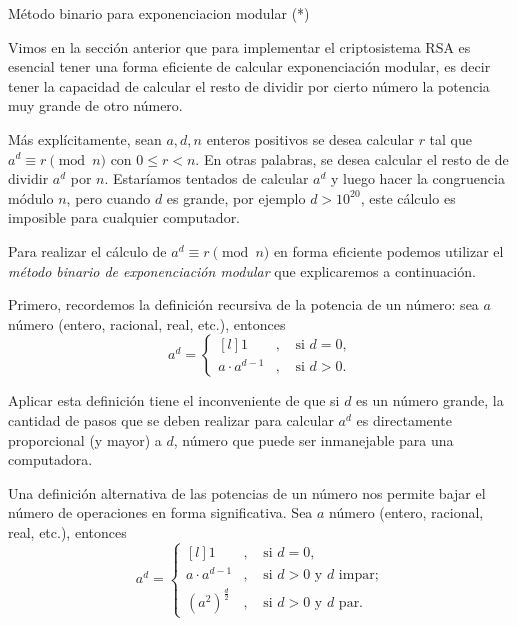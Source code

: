 \begin{section}{Método binario para exponenciacion modular (*)}\label{seccion-exponenciacion-modular}

    Vimos en la sección anterior que para implementar el criptosistema RSA  es esencial tener una forma eficiente de calcular exponenciación modular,  es decir tener la capacidad de calcular el resto de dividir por cierto número la potencia muy grande de otro número. 

    Más explícitamente, sean $a, d, n$ enteros positivos se desea calcular $r$ tal que $a^d \equiv r \pmod{n}$ con  $0 \le r < n$. En  otras palabras,  se desea calcular el resto de de dividir $a^d$ por $n$. Estaríamos tentados de calcular $a^d$ y luego hacer la congruencia módulo $n$, pero cuando $d$ es grande, por ejemplo $d > 10^{20}$, este cálculo es imposible para cualquier computador. 

    Para realizar el  cálculo de $a^d \equiv r \pmod{n}$ en forma eficiente podemos utilizar el \textit{método binario de exponenciación modular} que explicaremos a continuación. 

    Primero,  recordemos la definición recursiva de la potencia de un número: sea  $a$ número (entero, racional, real, etc.),  entonces 
    \begin{equation}\label{def-potencia-1}
        a^d = \left\{
        \begin{matrix*}[l]
            1&,&\text{ si $d = 0$,} \\
            a \cdot a^{d-1}&,&\text{ si $d > 0$.}
        \end{matrix*}\right.   
    \end{equation}   
    
    Aplicar esta definición tiene el inconveniente de que si $d$ es un número grande, la cantidad de pasos  que se deben realizar para calcular $a^d$ es directamente proporcional (y mayor) a $d$, número que puede ser inmanejable para una computadora. 
    
    Una definición alternativa de las potencias de un número nos permite bajar el número de operaciones  en forma significativa. Sea  $a$ número (entero, racional, real, etc.),  entonces
    \begin{equation}\label{def-potencia-2}
        a^d = \left\{
        \begin{matrix*}[l]
            1&,&\text{ si $d = 0$,} \\
            a \cdot a^{d-1}&,&\text{  si $d > 0$ y  $d$ impar;} \\
            {(a^2)}^{\frac{d}{2}}&,&\text{  si $d > 0$ y  $d$ par.}
        \end{matrix*}\right.   
    \end{equation}    


\end{section}

